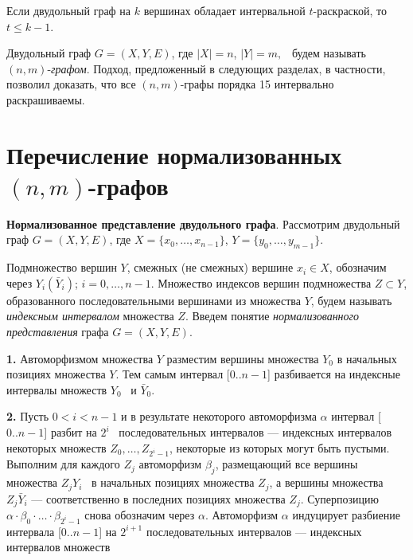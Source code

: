 \begin{statement}\label{AKM_ch1_s5}
	Если двудольный граф на  $k$  вершинах обладает интервальной  $t${}-раскраской, то  $t \leq k-1$.
\end{statement}

Двудольный граф  $G=(X,Y,E)$, где  $\left|X\right|=n$, $\left|Y\right|=m,$ \ будем называть  $(n,m)${}-\textit{графом}.
Подход, предложенный в следующих разделах, в частности, позволил доказать, что все  $(n,m)$-\linebreak графы порядка 15
интервально раскрашиваемы.

\section{Перечисление нормализованных $(n,m)$-графов}\label{AKM_ch1_3}
\hypertarget{Toc503377124}{}\textbf{Нормализованное представление двудольного графа}. Рассмотрим двудольный граф \linebreak
$G=(X,Y,E)$, где  $X=\{x_0,\dots,x_{n-1}\}$,  $Y=\{y_0,\dots,y_{m-1}\}$.

Подмножество вершин  $Y$, смежных (не смежных) вершине  $x_i\in X$, обозначим через  $Y_i(\bar{Y}_i)$;
$i=0,\dots ,n-1$.  Множество индексов вершин подмножества  $Z \subset Y$, образованного последовательными вершинами
из множества  $Y$, будем называть \textit{индексным интервалом} множества  $Z$. Введем понятие \textit{нормализованного
	представления} графа  $G=(X,Y,E)$.

\noindent\textbf{1.} Автоморфизмом множества  $Y$  разместим вершины множества  $Y_0$  в начальных позициях множества  $Y$. Тем
самым интервал [$0..n-1$] разбивается на индексные интервалы множеств  $Y_0$ \ и  $\bar{Y}_0$.

\noindent\textbf{2.} Пусть  $0<i<n-1$  и в результате некоторого автоморфизма  $\alpha $  интервал [$0 .. n-1$] разбит на  $2^i$
\ последовательных интервалов --- индексных интервалов некоторых множеств  $Z_0,\dots ,Z_{2^i-1}$, некоторые из которых
могут быть пустыми. Выполним для каждого  $Z_j$  автоморфизм  $\beta _j$, размещающий все вершины множества  $Z_jY_i$
\ в начальных позициях множества  $Z_j$, а вершины множества  $Z_j\bar{Y}_i$ --- соответственно в последних позициях
множества  $Z_j$. Суперпозицию  $\alpha {\cdot}\beta _0{\cdot}\dots {\cdot}\beta _{2^i-1}$  снова обозначим через
$\alpha $. Автоморфизм  $\alpha $  индуцирует разбиение интервала [$0..n-1$] на  $2^{i+1}$  последовательных
интервалов --- индексных интервалов множеств

